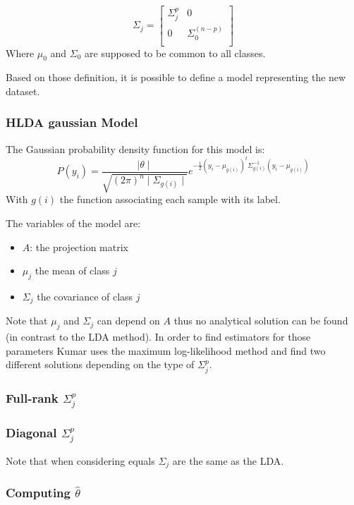 $$\Sigma_j =
\left [
  \begin{array}{cc}
    \Sigma_j^p & 0\\
    0 & \Sigma_0^{(n-p)}\\
  \end{array}
\right ]
$$
Where $\mu_0$ and $\Sigma_0$ are supposed to be common to all classes.

Based on those definition, it is possible to define a model representing the new dataset.

\subsubsection{HLDA gaussian Model}

The Gaussian probability density function for this model is:
$$P(y_i) = \frac{\mid \theta \mid}{\sqrt{(2\pi)^n \mid \Sigma_{g(i)} \mid}}
    e^{-\frac{1}{2} (y_i - \mu_{g(i)})^t \Sigma_{g(i)}^{-1} (y_i - \mu_{g(i)})}$$
With $g(i)$ the function associating each sample with its label.

The variables of the model are:
\begin{itemize}
  \item $A$: the projection matrix
  \item $\mu_j$ the mean of class $j$
  \item $\Sigma_j$ the covariance of class $j$
\end{itemize}

Note that $\mu_j$ and $\Sigma_j$ can depend on $A$ thus no analytical solution can be found (in contrast to the LDA method). In order to find estimators for those parameters Kumar\cite{kumar.1997} uses the maximum log-likelihood method and find two different solutions depending on the type of $\Sigma_j^p$.

\subsubsection{Full-rank $\Sigma_j^p$}


\subsubsection{Diagonal $\Sigma_j^p$}


Note that when considering equals $\Sigma_j$ are the same as the LDA.

\subsubsection{Computing $\hat \theta$}


